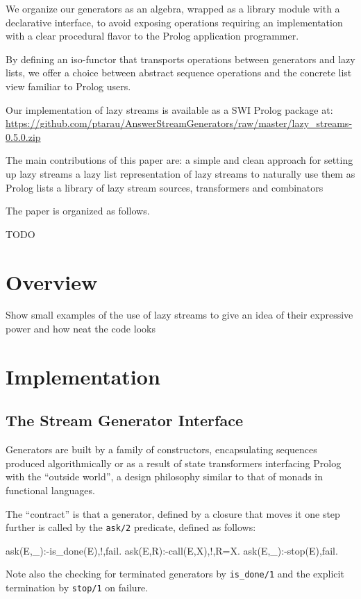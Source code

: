 \documentclass{new_tlp}
\begin{document}
We organize our generators as an algebra, wrapped as a library module with a declarative interface, to avoid exposing  operations requiring an implementation with a clear procedural flavor to the Prolog application programmer.

By defining an iso-functor that transports operations between
generators and lazy lists, we offer a choice between 
abstract sequence operations and the concrete list view familiar to Prolog users.

Our implementation of lazy streams is available as a SWI Prolog package at:\\
{\small \url{https://github.com/ptarau/AnswerStreamGenerators/raw/master/lazy_streams-0.5.0.zip } }

The main contributions of this paper are:
\BI
\I a simple and clean approach for setting up lazy streams
\I a lazy list representation of lazy streams to naturally use them as Prolog lists
\I a library of lazy stream sources, transformers and combinators %
\EI

The paper is organized as follows.

{\Large TODO}

\section{Overview}

{\Large
     Show small examples of the use of lazy streams to give an idea of their expressive power and how neat the code looks
 }
     
     
\section{Implementation}
     
\subsection{The Stream Generator Interface}

Generators are built by a family of constructors, encapsulating sequences produced algorithmically or as a result of state transformers interfacing Prolog with the ``outside world'', a design philosophy similar to that of monads in functional languages.

The ``contract'' is that a generator, defined by a closure that moves it one step further is called by the {\tt ask/2} predicate, defined as follows:
\begin{code}
ask(E,_):-is_done(E),!,fail.
ask(E,R):-call(E,X),!,R=X.
ask(E,_):-stop(E),fail.
\end{code}
Note also the checking for terminated generators by {\tt is\_done/1} and the explicit termination by {\tt stop/1} on failure.
\end{document}
